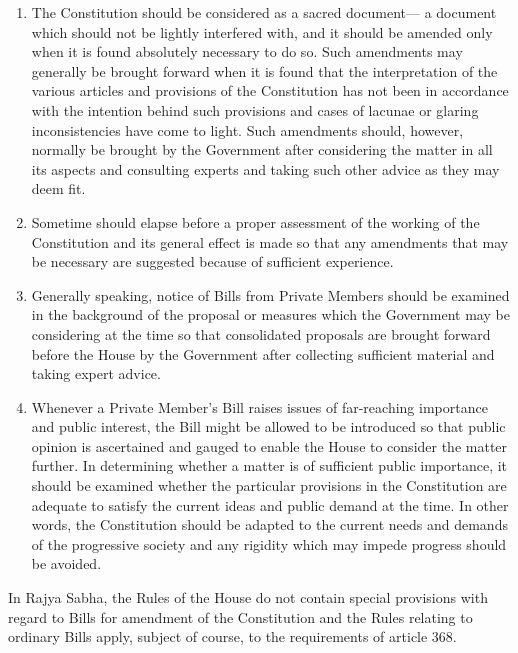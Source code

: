 \begin{multicols}{2}
\vspace{-.4cm}

\begin{enumerate}
\itemsep=0pt
\item The Constitution should be considered as a sacred document— a document which should
not be lightly interfered with, and it should be amended only when it is found absolutely
necessary to do so. Such amendments may generally be brought forward when it is found that
the interpretation of the various articles and provisions of the Constitution has not been in
accordance with the intention behind such provisions and cases of lacunae or glaring inconsistencies have come to light. Such amendments should, however, normally be brought
by the Government after considering the matter in all its aspects and consulting experts and
taking such other advice as they may deem fit.

\item Sometime should elapse before a proper assessment of the working of the Constitution and
its general effect is made so that any amendments that may be necessary are suggested because
of sufficient experience.

\item Generally speaking, notice of Bills from Private Members should be examined in the
background of the proposal or measures which the Government may be considering at the
time so that consolidated proposals are brought forward before the House by the Government
after collecting sufficient material and taking expert advice.

\item Whenever a Private Member’s Bill raises issues of far-reaching importance and public
interest, the Bill might be allowed to be introduced so that public opinion is ascertained and
gauged to enable the House to consider the matter further. In determining whether a matter is
of sufficient public importance, it should be examined whether the particular provisions in the
Constitution are adequate to satisfy the current ideas and public demand at the time. In other
words, the Constitution should be adapted to the current needs and demands of the progressive
society and any rigidity which may impede progress should be avoided.
\end{enumerate}

\vspace{-.3cm}

\noi
In Rajya Sabha, the Rules of the House do not contain special provisions with regard to Bills
for amendment of the Constitution and the Rules relating to ordinary Bills apply, subject of
course, to the requirements of article 368.


\end{multicols}
